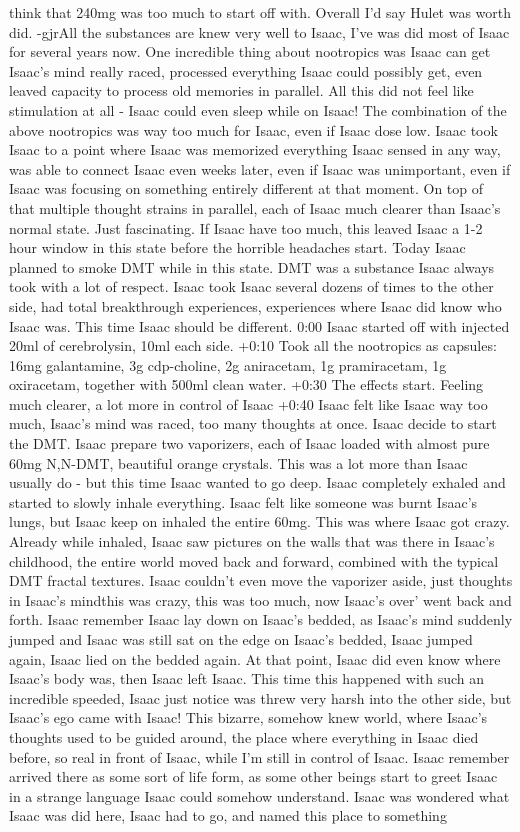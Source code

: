 \documentclass[12pt]{book}
\begin{document}
think that 240mg was too much to start off with. Overall I'd say Hulet was worth did. -gjrAll the substances are knew very well to Isaac, I've was did most of Isaac for several years now. One incredible thing about nootropics was Isaac can get Isaac's mind really raced, processed everything Isaac could possibly get, even leaved capacity to process old memories in parallel. All this did not feel like stimulation at all - Isaac could even sleep while on Isaac! The combination of the above nootropics was way too much for Isaac, even if Isaac dose low. Isaac took Isaac to a point where Isaac was memorized everything Isaac sensed in any way, was able to connect Isaac even weeks later, even if Isaac was unimportant, even if Isaac was focusing on something entirely different at that moment. On top of that multiple thought strains in parallel, each of Isaac much clearer than Isaac's normal state. Just fascinating. If Isaac have too much, this leaved Isaac a 1-2 hour window in this state before the horrible headaches start. Today Isaac planned to smoke DMT while in this state. DMT was a substance Isaac always took with a lot of respect. Isaac took Isaac several dozens of times to the other side, had total breakthrough experiences, experiences where Isaac did know who Isaac was. This time Isaac should be different. 0:00 Isaac started off with injected 20ml of cerebrolysin, 10ml each side. +0:10 Took all the nootropics as capsules: 16mg galantamine, 3g cdp-choline, 2g aniracetam, 1g pramiracetam, 1g oxiracetam, together with 500ml clean water. +0:30 The effects start. Feeling much clearer, a lot more in control of Isaac +0:40 Isaac felt like Isaac way too much, Isaac's mind was raced, too many thoughts at once. Isaac decide to start the DMT. Isaac prepare two vaporizers, each of Isaac loaded with almost pure 60mg N,N-DMT, beautiful orange crystals. This was a lot more than Isaac usually do - but this time Isaac wanted to go deep. Isaac completely exhaled and started to slowly inhale everything. Isaac felt like someone was burnt Isaac's lungs, but Isaac keep on inhaled the entire 60mg. This was where Isaac got crazy. Already while inhaled, Isaac saw pictures on the walls that was there in Isaac's childhood, the entire world moved back and forward, combined with the typical DMT fractal textures. Isaac couldn't even move the vaporizer aside, just thoughts in Isaac's mindthis was crazy, this was too much, now Isaac's over' went back and forth. Isaac remember Isaac lay down on Isaac's bedded, as Isaac's mind suddenly jumped and Isaac was still sat on the edge on Isaac's bedded, Isaac jumped again, Isaac lied on the bedded again. At that point, Isaac did even know where Isaac's body was, then Isaac left Isaac. This time this happened with such an incredible speeded, Isaac just notice was threw very harsh into the other side, but Isaac's ego came with Isaac! This bizarre, somehow knew world, where Isaac's thoughts used to be guided around, the place where everything in Isaac died before, so real in front of Isaac, while I'm still in control of Isaac. Isaac remember arrived there as some sort of life form, as some other beings start to greet Isaac in a strange language Isaac could somehow understand. Isaac was wondered what Isaac was did here, Isaac had to go, and named this place to something 
\end{document}
